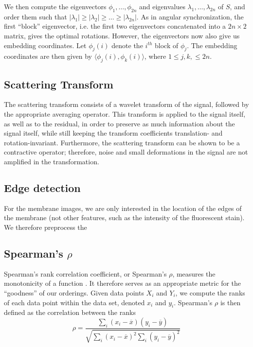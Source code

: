 \documentclass[10pt]{article}
\begin{document}
We then compute the eigenvectors $\phi_1, \dots, \phi_{2n}$ and eigenvalues $\lambda_1, \dots, \lambda_{2n}$ of $S$, and order them such that $|\lambda_1| \ge |\lambda_2| \ge \dots \ge |\lambda_{2n}|$.
%
As in angular synchronization, the first ``block'' eigenvector, i.e. the first two eigenvectors concatenated into a $2 n \times 2$ matrix, gives the optimal rotations. 
%
However, the eigenvectors now also give us embedding coordinates.
%
Let $\phi_j(i)$ denote the $i^{th}$ block of $\phi_j$. 
%
The embedding coordinates are then given by $\langle \phi_j(i), \phi_k(i) \rangle$, where $1 \le j, k, \le 2 n$. 

\subsection*{Scattering Transform}

The scattering transform consists of a wavelet transform of the signal, followed by  the appropriate averaging operator.
%
This transform is applied to the signal itself, as well as to the residual, in order to preserve as much information about the signal itself, while still keeping the transform coefficients translation- and rotation-invariant. 
% 
Furthermore, the scattering transform can be shown to be a contractive operator; therefore, noise and small deformations in the signal are not amplified in the transformation.

\subsection*{Edge detection}
For the membrane images, we are only interested in the location of the edges of the membrane (not other features, such as the intensity of the fluorescent stain).
%
We therefore preprocess the 

\subsection*{Spearman's $\rho$}

Spearman's rank correlation coefficient, or Spearman's $\rho$, measures the monotonicity of a function \cite{...}. 
%
It therefore serves as an appropriate metric for the ``goodness'' of our orderings.
%
Given data points $X_i$ and $Y_i$, we compute the ranks of each data point within the data set, denoted $x_i$ and $y_i$.
%
Spearman's $\rho$ is then defined as the correlation between the ranks
\begin{equation}
\rho = \frac{\sum_i (x_i - \overline{x})(y_i - \overline{y})}{\sqrt{\sum_i (x_i - \overline{x})^2 \sum_i (y_i - \overline{y})^2}}
\end{equation}
\end{document}
